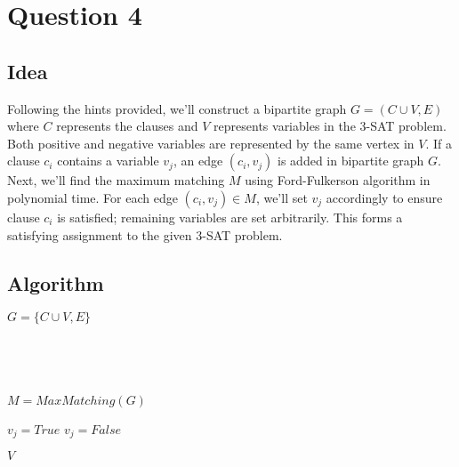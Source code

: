 \documentclass{article}
\begin{document}
    \section*{Question 4}
    
    \subsection*{Idea}
    Following the hints provided, we'll construct a bipartite graph $G = (C \cup V, E)$ where $C$ represents the clauses and $V$ represents variables in the 3-SAT problem. Both positive and negative variables are represented by the same vertex in $V$. If a clause $c_i$ contains a variable $v_j$, an edge $(c_i, v_j)$ is added in bipartite graph $G$. Next, we'll find the maximum matching $M$ using Ford-Fulkerson algorithm in polynomial time. For each edge $(c_i, v_j) \in M$, we'll set $v_j$ accordingly to ensure clause $c_i$ is satisfied; remaining variables are set arbitrarily. This forms a satisfying assignment to the given 3-SAT problem.
    
    \subsection*{Algorithm}
        \begin{algorithm}[H]
            \begin{algorithmic}
                    \State $G = \{C \cup V, E\}$ \\
                     \\ 
                     \\
                     \\ \\

                    \State $M = MaxMatching(G)$

                            \State $v_j = True$
                        \Else
                            \State $v_j = False$
                        \EndIf
                    \EndFor

                    \State \Return $V$
                \EndProcedure
            \end{algorithmic}
        \end{algorithm}
\end{document}
